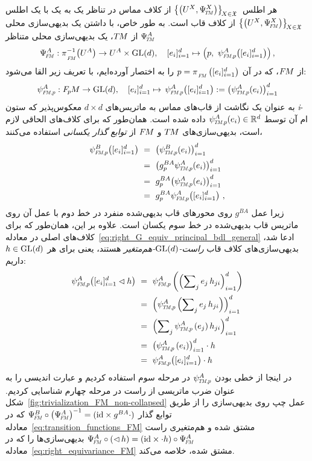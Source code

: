 هر اطلس
$\big\{ \big(U^X, \PsiTM^X \big) \big\}_{\!X\in\mathfrak{X}}\,$
از کلاف مماس در تناظر یک به یک با یک اطلس
$\big\{ \big(U^X, \PsiFM^X \big) \big\}_{\!X\in\mathfrak{X}}\,$
از کلاف قاب است.
به طور خاص، با داشتن یک بدیهی‌سازی محلی $\PsiTM^A$ از $T\mkern-1.5muM$، یک بدیهی‌سازی محلی متناظر
\begin{align}\label{eq:trivialization_FM}
	\PsiFM^A: \piFM^{-1}\big(U^A\big)\to U^A\times \GL{d}, \quad
	[e_{i}]_{i=1}^d \mapsto \pig(p,\ \psiFMp^A\big([e_{i}]_{i=1}^d\big) \pig) \,,
\end{align}
از $F\mkern-1.5muM$، که در آن $p=\piFM\left( [e_{i}]_{i=1}^d\right)$ را به اختصار آورده‌ایم، با تعریف زیر القا می‌شود:
\begin{align}\label{eq:trivialization_FM_p}
	\psiFMp^A: \FpM\to \GL{d}, \quad
	[e_{i}]_{i=1}^d \mapsto\, \psiFMp^A \big([e_{i}]_{i=1}^d\big) := \big(\psiTMp^A(e_{i})\big)_{i=1}^d
\end{align}
به عنوان یک نگاشت از قاب‌های مماس به ماتریس‌های $d\!\times\!d$ معکوس‌پذیر که ستون \emph{i}-ام آن توسط $\psiTMp^A(e_{i})\in\R^d$ داده شده است.
همان‌طور که برای کلاف‌های الحاقی لازم است، بدیهی‌سازی‌های $T\mkern-1.5muM$ و $F\mkern-1.5muM$ از \emph{توابع گذار یکسانی} استفاده می‌کنند،
\begin{align}\label{eq:transition_functions_FM}
	\psiFMp^B\big([e_{i}]_{i=1}^d\big)
	\ &=\ \big(\psiTMp^B(e_{i}) \big)_{i=1}^d \notag \\
	\ &=\ \big(g_p^{BA} \psiTMp^A(e_{i}) \big)_{i=1}^d \notag \\
	\ &=\ g_p^{BA} \big(\psiTMp^A(e_{i}) \big)_{i=1}^d \notag \\
	\ &=\ g_p^{BA} \psiFMp^A\big([e_{i}]_{i=1}^d \big) \ ,
\end{align}
زیرا عمل $g^{BA}$ روی محورهای قاب بدیهی‌شده منفرد در خط دوم با عمل آن روی ماتریس قاب بدیهی‌شده در خط سوم یکسان است.
علاوه بر این، همان‌طور که برای کلاف‌های اصلی در معادله~\eqref{eq:right_G_equiv_principal_bdl_general} ادعا شد، بدیهی‌سازی‌های کلاف قاب \emph{راست-$\operatorname{GL}(d)$-هم‌متغیر} هستند، یعنی برای هر $h\in \operatorname{GL}(d)$ داریم:
\begin{align}\label{eq:right_equivariance_FM}
	\psiFMp^A\big([e_{i}]_{i=1}^d \lhd h\big)
	\ &=\ \psiFMp^A\left(\left(\sum\nolimits_j e_{j}\, h_{ji} \right)_{i=1}^d\right) \notag \\
	\ &=\ \left(\psiTMp^A\left(\sum\nolimits_j e_{j}\, h_{ji} \right)\right)_{i=1}^d \notag \\
	\ &=\ \left(\sum\nolimits_j \psiTMp^A\left(e_{j}\right) h_{ji} \right)_{i=1}^d \notag \\
	\ &=\ \left( \psiTMp^A\left(e_{i}\right) \right)_{i=1}^d  \cdot h \notag \\
	\ &=\ \psiFMp^A\big( [e_{i}]_{i=1}^d \big) \cdot h
\end{align}
در اینجا از خطی بودن $\psiTMp^A$ در مرحله سوم استفاده کردیم و عبارت اندیسی را به عنوان ضرب ماتریسی از راست در مرحله چهارم شناسایی کردیم.
شکل~\ref{fig:trivialization_FM_non-collapsed} عمل چپ روی بدیهی‌سازی را از طریق توابع گذار $\PsiFM^B \circ \left(\PsiFM^A\right)^{-1} = (\id\times g^{BA}\cdot)$ که در معادله~\eqref{eq:transition_functions_FM} مشتق شده و هم‌متغیری راست $\PsiFM^A\circ(\lhd\, h) = (\id\times\cdot h)\circ\PsiFM^A$ بدیهی‌سازی‌ها را که در معادله~\eqref{eq:right_equivariance_FM} مشتق شده، خلاصه می‌کند.

